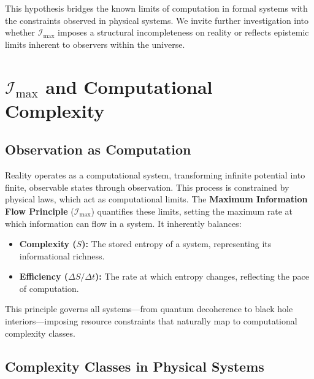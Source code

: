 \documentclass[12pt]{article}
\begin{document}
This hypothesis bridges the known limits of computation in formal systems with the constraints observed in physical systems. We invite further investigation into whether $\mathcal{I}_{\text{max}}$ imposes a structural incompleteness on reality or reflects epistemic limits inherent to observers within the universe.


\section{$\mathcal{I}_{\text{max}}$ and Computational Complexity}

\subsection{Observation as Computation}

Reality operates as a computational system, transforming infinite potential into finite, observable states through observation. This process is constrained by physical laws, which act as computational limits. The \textbf{Maximum Information Flow Principle} ($\mathcal{I}_{\text{max}}$) quantifies these limits, setting the maximum rate at which information can flow in a system. It inherently balances:
\begin{itemize}
    \item \textbf{Complexity ($S$):} The stored entropy of a system, representing its informational richness.
    \item \textbf{Efficiency ($\Delta S / \Delta t$):} The rate at which entropy changes, reflecting the pace of computation.
\end{itemize}

This principle governs all systems—from quantum decoherence to black hole interiors—imposing resource constraints that naturally map to computational complexity classes.

\subsection{Complexity Classes in Physical Systems}
\end{document}
